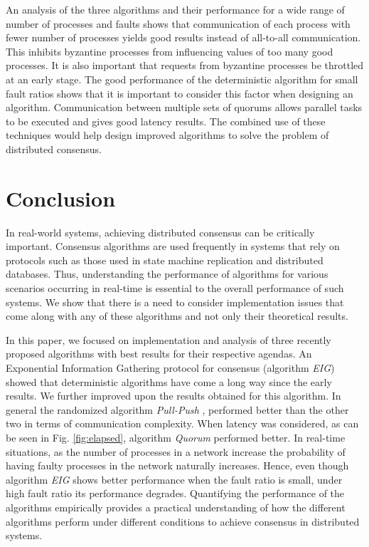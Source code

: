 An analysis of the three algorithms and their performance for a wide range of number of processes and faults shows that communication of each process with fewer number of processes yields good results instead of all-to-all communication. This inhibits byzantine processes from influencing values of too many good processes. It is also important that requests from byzantine processes be throttled at an early stage. The good performance of the deterministic algorithm for small fault ratios shows that it is important to consider this factor when designing an algorithm.  Communication between multiple sets of quorums allows parallel tasks to be executed and gives good latency results. The combined use of these techniques would help design improved algorithms to solve the problem of distributed consensus. 



\section{Conclusion}
\label{sec:conc}
In real-world systems, achieving distributed consensus can be critically important. Consensus algorithms are used frequently in systems that rely on protocols such as those used in state machine replication and distributed databases. Thus, understanding the performance of algorithms for various scenarios occurring in real-time is essential to the overall performance of such systems. We show that there is a need to consider implementation issues that come along with any of these algorithms and not only their theoretical results. 

In this paper, we focused on implementation and analysis of three recently proposed algorithms with best results for their respective agendas. An Exponential Information Gathering protocol for consensus \cite{KM13} (algorithm \textit{EIG}) showed that deterministic algorithms have come a long way since the early results. We further improved upon the results obtained for this algorithm. In general the randomized algorithm \textit{Pull-Push} \cite{BGH13}, performed better than the other two in terms of communication complexity. When latency was considered, as can be seen in Fig. \ref{fig:elapsed}, algorithm \textit{Quorum} \cite{BPV06} performed better. In real-time situations, as the number of processes in a network increase the probability of having faulty processes in the network naturally increases. Hence, even though algorithm \textit{EIG} shows better performance when the fault ratio is small, under high fault ratio its performance degrades. Quantifying the performance of the algorithms empirically provides a
practical understanding of how the different algorithms perform under
different conditions to achieve consensus in distributed systems.
